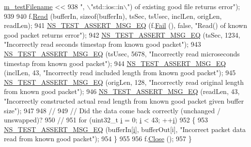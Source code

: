 \begin{DoxyCode}
      \hyperlink{classRecordHeaderTestCase_a120cda070e5262333c795ce77359528e}{m\_testFilename} << 
938                          \textcolor{stringliteral}{", \(\backslash\)"std::ios::in\(\backslash\)") of existing good file returns error"});
939 
940   f.\hyperlink{classns3_1_1PcapFile_a18c5045735408fe45a8cbc9e6b34a4fb}{Read} (bufferIn, \textcolor{keyword}{sizeof}(bufferIn), tsSec, tsUsec, inclLen, origLen, readLen);
941   \hyperlink{group__testing_ga2a9d78cffb3db8e867c35fff0b698cf5}{NS\_TEST\_ASSERT\_MSG\_EQ} (f.\hyperlink{classns3_1_1PcapFile_a2e00aa080890a0c9c3e9f5bd2d6c21d5}{Fail} (), \textcolor{keyword}{false}, \textcolor{stringliteral}{"Read() of known good packet returns
       error"});
942   \hyperlink{group__testing_ga2a9d78cffb3db8e867c35fff0b698cf5}{NS\_TEST\_ASSERT\_MSG\_EQ} (tsSec, 1234, \textcolor{stringliteral}{"Incorrectly read seconds timestap from known
       good packet"});
943   \hyperlink{group__testing_ga2a9d78cffb3db8e867c35fff0b698cf5}{NS\_TEST\_ASSERT\_MSG\_EQ} (tsUsec, 5678, \textcolor{stringliteral}{"Incorrectly read microseconds timestap from
       known good packet"});
944   \hyperlink{group__testing_ga2a9d78cffb3db8e867c35fff0b698cf5}{NS\_TEST\_ASSERT\_MSG\_EQ} (inclLen, 43, \textcolor{stringliteral}{"Incorrectly read included length from known
       good packet"});
945   \hyperlink{group__testing_ga2a9d78cffb3db8e867c35fff0b698cf5}{NS\_TEST\_ASSERT\_MSG\_EQ} (origLen, 128, \textcolor{stringliteral}{"Incorrectly read original length from known
       good packet"});
946   \hyperlink{group__testing_ga2a9d78cffb3db8e867c35fff0b698cf5}{NS\_TEST\_ASSERT\_MSG\_EQ} (readLen, 43, \textcolor{stringliteral}{"Incorrectly constructed actual read length from
       known good packet given buffer size"});
947 
948   \textcolor{comment}{//}
949   \textcolor{comment}{// Did the data come back correctly (unchanged / unswapped)?}
950   \textcolor{comment}{//}
951   \textcolor{keywordflow}{for} (uint32\_t \hyperlink{bernuolliDistribution_8m_a6f6ccfcf58b31cb6412107d9d5281426}{i} = 0; \hyperlink{bernuolliDistribution_8m_a6f6ccfcf58b31cb6412107d9d5281426}{i} < 43; ++\hyperlink{bernuolliDistribution_8m_a6f6ccfcf58b31cb6412107d9d5281426}{i})
952     \{
953       \hyperlink{group__testing_ga2a9d78cffb3db8e867c35fff0b698cf5}{NS\_TEST\_ASSERT\_MSG\_EQ} (bufferIn[\hyperlink{bernuolliDistribution_8m_a6f6ccfcf58b31cb6412107d9d5281426}{i}], bufferOut[i], \textcolor{stringliteral}{"Incorrect packet data read
       from known good packet"});
954     \}
955 
956   f.\hyperlink{classns3_1_1PcapFile_ad3b6c28d464742ee1fa3a64628339a5b}{Close} ();
957 \}
\end{DoxyCode}


